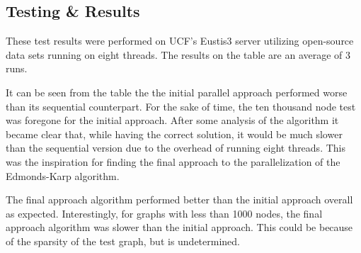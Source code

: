 \subsection{Testing \& Results}
\vspace{7}
    These test results were performed on UCF's Eustis3 server utilizing open-source data sets \cite{sumitpadhiyar} running on eight threads. The results on the table are an average of 3 runs.
    
    It can be seen from the table the the initial parallel approach performed worse than its sequential counterpart. For the sake of time, the ten thousand node test was foregone for the initial approach. After some analysis of the algorithm it became clear that, while having the correct solution, it would be much slower than the sequential version due to the overhead of running eight threads. This was the inspiration for finding the final approach to the parallelization of the Edmonds-Karp algorithm.
    
    The final approach algorithm performed better than the initial approach overall as expected. Interestingly, for graphs with less than 1000 nodes, the final approach algorithm was slower than the initial approach. This could be because of the sparsity of the test graph, but is undetermined.
    
